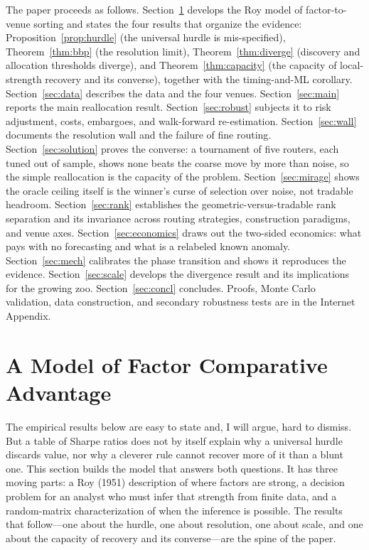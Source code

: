 \documentclass[12pt]{article}
\theoremstyle{plain}
\theoremstyle{definition}
\begin{document}
The paper proceeds as follows. Section~\ref{sec:model} develops the Roy model of
factor-to-venue sorting and states the four results that organize the evidence:
Proposition~\ref{prop:hurdle} (the universal hurdle is mis-specified),
Theorem~\ref{thm:bbp} (the resolution limit), Theorem~\ref{thm:diverge}
(discovery and allocation thresholds diverge), and Theorem~\ref{thm:capacity}
(the capacity of local-strength recovery and its converse), together with the
timing-and-ML corollary. Section~\ref{sec:data} describes the data and the four venues.
Section~\ref{sec:main} reports the main reallocation result.
Section~\ref{sec:robust} subjects it to risk adjustment, costs, embargoes, and
walk-forward re-estimation. Section~\ref{sec:wall} documents the resolution wall
and the failure of fine routing. Section~\ref{sec:solution} proves the converse:
a tournament of five routers, each tuned out of sample, shows none beats the
coarse move by more than noise, so the simple reallocation is the capacity of the
problem. Section~\ref{sec:mirage} shows the oracle ceiling itself is the winner's
curse of selection over noise, not tradable headroom. Section~\ref{sec:rank}
establishes the geometric-versus-tradable rank separation and its invariance
across routing strategies, construction paradigms, and venue axes.
Section~\ref{sec:economics} draws out the two-sided economics: what pays with no
forecasting and what is a relabeled known anomaly. Section~\ref{sec:mech} calibrates the phase
transition and shows it reproduces the evidence. Section~\ref{sec:scale} develops
the divergence result and its implications for the growing zoo.
Section~\ref{sec:concl} concludes. Proofs, Monte Carlo validation, data
construction, and secondary robustness tests are in the Internet Appendix.

\section{A Model of Factor Comparative Advantage}
\label{sec:model}

The empirical results below are easy to state and, I will argue, hard to
dismiss. But a table of Sharpe ratios does not by itself explain why a universal
hurdle discards value, nor why a cleverer rule cannot recover more of it than a
blunt one. This section builds the model that answers both questions. It has
three moving parts: a Roy (1951) description of where factors are strong, a
decision problem for an analyst who must infer that strength from finite data,
and a random-matrix characterization of when the inference is possible. The
results that follow---one about the hurdle, one about resolution, one about
scale, and one about the capacity of recovery and its converse---are the spine of
the paper.
\end{document}
